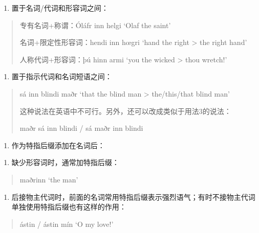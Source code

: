 \begin{enumerate}
\def\labelenumi{\arabic{enumi})}
\setcounter{enumi}{2}
\item
  置于名词/代词和形容词之间：
\end{enumerate}

\begin{quote}
专有名词+称谓：Óláfr inn helgi `Olaf the saint'

名词+限定性形容词：hendi inn hœgri `hand the right \textgreater{} the
right hand'

人称代词+形容词：þú hinn armi `you the wicked \textgreater{} thou
wretch!'
\end{quote}

\begin{enumerate}
\def\labelenumi{\arabic{enumi})}
\setcounter{enumi}{3}
\item
  置于指示代词和名词短语之间：
\end{enumerate}

\begin{quote}
sá inn blindi maðr `that the blind man \textgreater{} the/this/that
blind man'

这种说法在英语中不可行。另外，还可以改成类似于用法3的说法：

maðr sá inn blindi / sá maðr inn blindi
\end{quote}

\begin{enumerate}
\def\labelenumi{\Alph{enumi}.}
\setcounter{enumi}{1}
\item
  作为特指后缀添加在名词后：
\end{enumerate}

\begin{enumerate}
\def\labelenumi{\arabic{enumi})}
\item
  缺少形容词时，通常加特指后缀：
\end{enumerate}

\begin{quote}
maðrinn `the man'
\end{quote}

\begin{enumerate}
\def\labelenumi{\arabic{enumi})}
\setcounter{enumi}{1}
\item
  后接物主代词时，前面的名词常用特指后缀表示强烈语气；有时不接物主代词单独使用特指后缀也有这样的作用：
\end{enumerate}

\begin{quote}
ástin / ástin mín `O my love!'
\end{quote}

